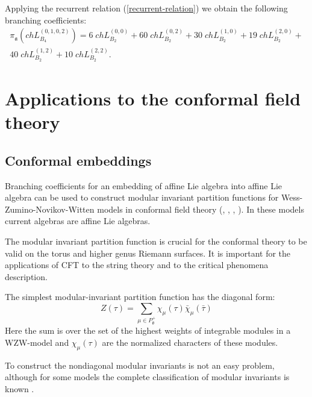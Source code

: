 \documentclass[12pt]{iopart}
\theoremstyle{definition}
\begin{document}
Applying the recurrent relation (\ref{recurrent-relation}) we obtain the
following branching coefficients:
\begin{eqnarray*}
  \label{eq:24}
  \pi_{\mathfrak{a}} \left(ch L^{(0,1,0,2)}_{B_4}\right) = 6 \; ch L^{(0,0)}_{B_2}+ 60
  \; ch L_{B_2}^{(0,2)}+ 30 \; ch L_{B_2}^{(1,0)}+ 19 \; ch L_{B_2}^{(2,0)}+\\
  40 \; ch L_{B_2}^{(1,2)}+ 10 \; ch L_{B_2}^{(2,2)}.
\end{eqnarray*}
\section{Applications to the conformal field theory}
\label{sec:phys-appl}

\subsection{Conformal embeddings}
\label{sec:conformal-embeddings}

Branching coefficients for an embedding of affine Lie algebra into
affine Lie algebra can be used to construct modular invariant
partition functions for Wess-Zumino-Novikov-Witten models in conformal field theory
(\cite{difrancesco1997cft}, \cite{Walton:1999xc}, \cite{walton1989conformal}, \cite{schellekens1986conformal}).
In these models current algebras are affine Lie algebras.

The modular invariant partition function is crucial for the conformal theory to be valid
on the torus and higher genus Riemann surfaces. It is important for the applications of
CFT to the string theory and to the critical phenomena description.

The simplest modular-invariant partition function has the diagonal form:
\begin{equation*}
  \label{eq:34}
   Z(\tau)=\sum_{ \mu\in P^{+}_{\mathfrak{g}}} \chi_{\mu}(\tau)\bar \chi_{\mu}(\bar \tau)
\end{equation*}
Here the sum is over the set of the highest weights of integrable modules in a WZW-model
and $\chi_{\mu}(\tau)$ are the normalized characters of these modules.

To construct the nondiagonal modular invariants is not an easy problem,
although for some models the complete classification of modular invariants is known \cite{1994hepthGannon,1995JMPGannon}.
\end{document}
